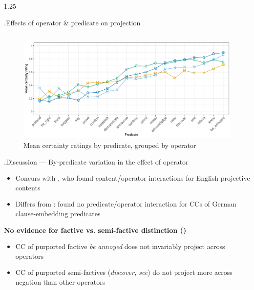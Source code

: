 \documentclass[final, table]{beamer}
\newlength{\colwidth}
\newlength{\vboxsep}
\newlength{\mboxpreadjust}
\begin{document}
\begin{frame}[t]
\begin{columns}[t]
\begin{column}{1.25\colwidth}
\begin{normalbox}{\phantom.\hfill Effects of operator \& predicate on projection}
\begin{tabular}{p{.70\linewidth} p{.3\linewidth}}
				\end{tabular}
				\vspace{-1.6\baselineskip}
				\begin{figure}[h]
					\centering
					\includegraphics[width=\linewidth]{projective-pred-op.pdf}
					\vspace{-2.2\baselineskip}
					\caption{Mean certainty ratings by predicate, grouped by operator}
					\label{fig:figure3}
				\end{figure}
				\vspace{-.8\baselineskip}
			\end{normalbox}
			
			\vspace{\vboxsep}	
			\begin{normalbox}{\phantom.\hfill Discussion --- By-predicate variation in the effect of operator}
				\begin{itemize}
					\item Concurs with \citet{smith_relationship_2014}, who found content/operator interactions for English projective contents
					\item Differs from \citet{sieker_projective_2022}: found no predicate/operator interaction for CCs of German clause-embedding predicates
				\end{itemize}
				
				\textbf{No evidence for factive vs. semi-factive distinction (\citealt{karttunen_observations_1971})}
				\vspace{\mboxpreadjust}
				\begin{itemize}
					\item CC of purported factive \textit{be annoyed} does not invariably project across operators
					\item CC of purported semi-factives (\textit{discover, see}) do not project more across negation than other operators
				\end{itemize}


\end{normalbox}
\end{column}
\end{columns}
\end{frame}
\end{document}

